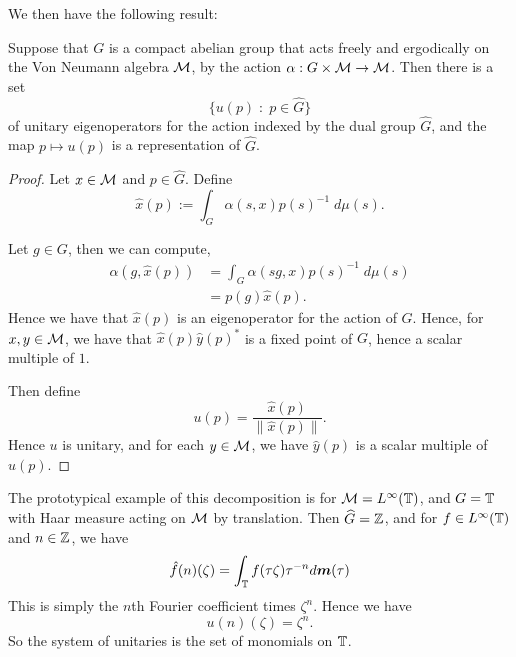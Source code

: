 We then have the following result:
\begin{proposition}
    Suppose that $G$ is a compact abelian group that acts freely and ergodically
    on the Von Neumann algebra $\mathcal{M}$, by the action $\alpha:G\times\mathcal{M}\rightarrow\mathcal{M}$. Then there is a set 
    \begin{equation}
        \{ u(p) \;:\; p \in \widehat{G}\}
    \end{equation}
    of unitary eigenoperators for the action indexed by the dual group $\widehat{G}$,
    and the map $p\mapsto u(p)$ is a representation of $\widehat{G}$.
\end{proposition}
\begin{proof}
    Let $x \in \mathcal{M}$ and $p \in \widehat{G}$. Define
    \begin{equation}
        \hat{x}(p) := \int_G \alpha(s,x) p(s)^{-1} \;d\mu(s).
    \end{equation}
    
    Let $g \in G$, then we can compute,
    \begin{align}
        \alpha(g,\hat{x}(p)) &= \int_G \alpha(sg,x)p(s)^{-1} \;d\mu(s)\\
        &= p(g)\hat{x}(p).
    \end{align}
    Hence we have that $\hat{x}(p)$ is an eigenoperator for the action of $G$.
    Hence, for $x,y \in \mathcal{M}$, we have that $\hat{x}(p)\hat{y}(p)^*$ is a fixed
    point of $G$, hence a scalar multiple of $1$. 
    
    Then define
    \begin{equation}
        u(p) = \frac{\hat{x}(p)}{\|\hat{x}(p)\|}.
    \end{equation}
    Hence $u$ is unitary, and for each $y \in \mathcal{M}$, we have $\hat{y}(p)$ is a scalar
    multiple of $u(p)$.
\end{proof} 
\begin{example}
    The prototypical example of this decomposition is for $\mathcal{M} = L^\infty(\mathbb{T})$,
    and $G = \mathbb{T}$ with Haar measure  acting on $\mathcal{M}$ by translation. Then $\widehat{G} = \mathbb{Z}$,
    and for $f \in L^\infty(\mathbb{T})$ and $n \in \mathbb{Z}$, we have
    \begin{equation}
        \hat{f}(n)(\zeta) = \int_{\mathbb{T}} f(\tau\zeta) \tau^{-n} d\boldsymbol{m}(\tau)
    \end{equation}
    This is simply the $n$th Fourier coefficient times $\zeta^n$. Hence we have
    \begin{equation}
        u(n)(\zeta) = \zeta^n.
    \end{equation}
    So the system of unitaries is the set of monomials on $\mathbb{T}$. 
\end{example}
